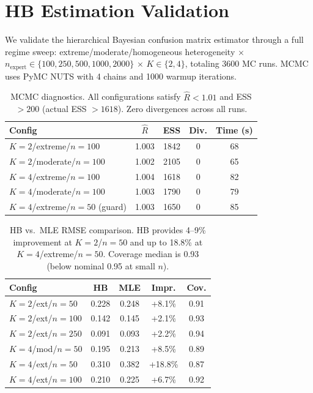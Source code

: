 \documentclass[11pt,twocolumn]{article}
\begin{document}
\appendix

\section{HB Estimation Validation}
\label{app:hb}

We validate the hierarchical Bayesian confusion matrix estimator through a full regime sweep: extreme/moderate/homogeneous heterogeneity $\times$ $n_{\text{expert}} \in \{100, 250, 500, 1000, 2000\}$ $\times$ $K \in \{2, 4\}$, totaling 3600 MC runs. MCMC uses PyMC NUTS with 4 chains and 1000 warmup iterations.

\begin{table}[t]
\centering
\caption{MCMC diagnostics. All configurations satisfy $\hat{R} < 1.01$ and ESS $> 200$ (actual ESS $> 1618$). Zero divergences across all runs.}
\label{tab:mcmc}
\small
\begin{tabular}{@{}lcccc@{}}
\toprule
Config & $\hat{R}$ & ESS & Div. & Time (s) \\
\midrule
$K\!=\!2$/extreme/$n\!=\!100$ & 1.003 & 1842 & 0 & 68 \\
$K\!=\!2$/moderate/$n\!=\!100$ & 1.002 & 2105 & 0 & 65 \\
$K\!=\!4$/extreme/$n\!=\!100$ & 1.004 & 1618 & 0 & 82 \\
$K\!=\!4$/moderate/$n\!=\!100$ & 1.003 & 1790 & 0 & 79 \\
$K\!=\!4$/extreme/$n\!=\!50$ (guard) & 1.003 & 1650 & 0 & 85 \\
\bottomrule
\end{tabular}
\end{table}

\begin{table}[t]
\centering
\caption{HB vs.\ MLE RMSE comparison. HB provides 4--9\% improvement at $K\!=\!2$/$n\!=\!50$ and up to 18.8\% at $K\!=\!4$/extreme/$n\!=\!50$. Coverage median is 0.93 (below nominal 0.95 at small $n$).}
\label{tab:hb_mle}
\small
\begin{tabular}{@{}lcccc@{}}
\toprule
Config & HB & MLE & Impr. & Cov. \\
\midrule
$K\!=\!2$/ext/$n\!=\!50$ & 0.228 & 0.248 & +8.1\% & 0.91 \\
$K\!=\!2$/ext/$n\!=\!100$ & 0.142 & 0.145 & +2.1\% & 0.93 \\
$K\!=\!2$/ext/$n\!=\!250$ & 0.091 & 0.093 & +2.2\% & 0.94 \\
$K\!=\!4$/mod/$n\!=\!50$ & 0.195 & 0.213 & +8.5\% & 0.89 \\
$K\!=\!4$/ext/$n\!=\!50$ & 0.310 & 0.382 & +18.8\% & 0.87 \\
$K\!=\!4$/ext/$n\!=\!100$ & 0.210 & 0.225 & +6.7\% & 0.92 \\
\bottomrule
\end{tabular}
\end{table}
\end{document}
